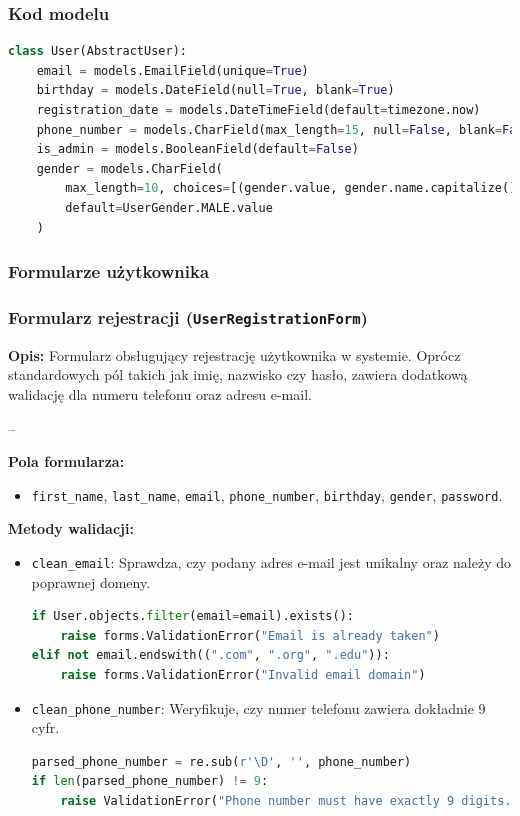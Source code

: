 \documentclass[12pt,a4paper,oneside]{article}
\theoremstyle{definition}
\numberwithin{equation}{section}
\begin{document}
\subsubsection{Kod modelu}
\begin{lstlisting}[language=Python, caption=Model \texttt{User}]
class User(AbstractUser):
    email = models.EmailField(unique=True)
    birthday = models.DateField(null=True, blank=True)
    registration_date = models.DateTimeField(default=timezone.now)
    phone_number = models.CharField(max_length=15, null=False, blank=False)
    is_admin = models.BooleanField(default=False)
    gender = models.CharField(
        max_length=10, choices=[(gender.value, gender.name.capitalize()) for gender in UserGender],
        default=UserGender.MALE.value
    )
\end{lstlisting}


\subsubsection{Formularze użytkownika}
\linespread{1.3}
\subsubsection*{Formularz rejestracji (\texttt{UserRegistrationForm})}

\textbf{Opis:}
Formularz obsługujący rejestrację użytkownika w systemie. Oprócz standardowych pól takich jak imię, nazwisko czy hasło, zawiera dodatkową walidację dla numeru telefonu oraz adresu e-mail.

--

\textbf{Pola formularza:}
\begin{itemize}
    \item \texttt{first\_name}, \texttt{last\_name}, \texttt{email}, \texttt{phone\_number}, \texttt{birthday}, \texttt{gender}, \texttt{password}.
\end{itemize}

\textbf{Metody walidacji:}
\begin{itemize}
    \item \texttt{clean\_email}: Sprawdza, czy podany adres e-mail jest unikalny oraz należy do poprawnej domeny.
\begin{lstlisting}[language=Python]
if User.objects.filter(email=email).exists():
    raise forms.ValidationError("Email is already taken")
elif not email.endswith((".com", ".org", ".edu")):
    raise forms.ValidationError("Invalid email domain")
\end{lstlisting}
    \item \texttt{clean\_phone\_number}: Weryfikuje, czy numer telefonu zawiera dokładnie 9 cyfr.
\begin{lstlisting}[language=Python]
parsed_phone_number = re.sub(r'\D', '', phone_number)
if len(parsed_phone_number) != 9:
    raise ValidationError("Phone number must have exactly 9 digits.")
\end{lstlisting}
\end{itemize}
\end{document}

